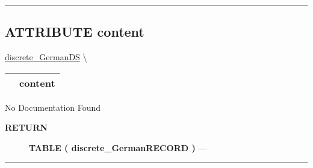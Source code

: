 \rule{\linewidth}{0.5pt}

\subsection*{\textsf{\colorbox{headtoc}{\color{white} ATTRIBUTE}
content}}

\hypertarget{ecldoc:logisticregression.validation.discrete_germands.content}{}
\hspace{0pt} \hyperlink{ecldoc:LogisticRegression.validation.discrete_GermanDS}{discrete_GermanDS} \textbackslash 

{\renewcommand{\arraystretch}{1.5}
\begin{tabularx}{\textwidth}{|>{\raggedright\arraybackslash}l|X|}
\hline
\hspace{0pt}\mytexttt{\color{red} } & \textbf{content} \\
\hline
\end{tabularx}
}

\par





No Documentation Found








\par
\begin{description}
\item [\colorbox{tagtype}{\color{white} \textbf{\textsf{RETURN}}}] \textbf{TABLE ( discrete\_GermanRECORD )} --- 
\end{description}




\rule{\linewidth}{0.5pt}


